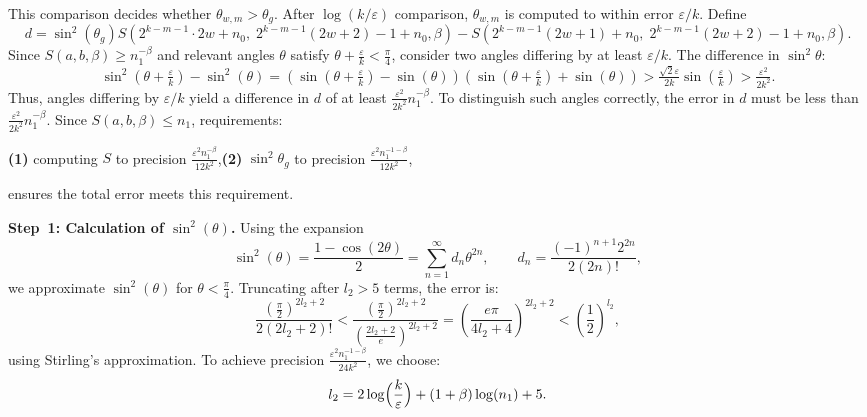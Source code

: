 \documentclass[aps,pra,twocolumn,superscriptaddress,preprintnumbers,amsmath,amssymb]{revtex4-2}
\begin{document}
    This comparison decides whether $\theta_{w,m}>\theta_g$. After $\log(k/\varepsilon)$ comparison,  $\theta_{w,m}$ is computed to within error $\varepsilon/k$. Define
    \begin{equation}
    d=\sin^2(\theta_g)S(2^{k-m-1}\cdot 2w+n_0,\;2^{k-m-1}(2w+2)-1+n_0,\beta)
    -S(2^{k-m-1}(2w+1)+n_0,\;2^{k-m-1}(2w+2)-1+n_0,\beta).
    \end{equation}
    Since $S(a,b,\beta)\ge n_1^{-\beta}$ and relevant angles $\theta$ satisfy 
    $\theta+\frac{\varepsilon}{k}<\frac{\pi}{4}$, consider two angles differing by at least \( \varepsilon/k \). The difference in \( \sin^2 \theta \):
    \begin{equation}
   \sin^2(\theta+\tfrac{\varepsilon}{k})-\sin^2(\theta)=(\sin(\theta+\tfrac{\varepsilon}{k})-\sin(\theta))(\sin(\theta+\tfrac{\varepsilon}{k})+\sin(\theta))>\tfrac{\sqrt{2}\varepsilon}{2k}\sin(\tfrac{\varepsilon}{k})>\tfrac{\varepsilon^2}{2k^2}.
    \end{equation}
    Thus, angles differing by \( \varepsilon/k \) yield a difference in \( d \) of at least $\frac{\varepsilon^2}{2k^2}n_1^{-\beta}$.
    To distinguish such angles correctly, the  error in $d$ must be less than $\frac{\varepsilon^2}{2k^2}n_1^{-\beta}$. Since \( S(a, b, \beta) \leq n_1 \), requirements:
    \begin{center}
        \textbf{(1)}    computing \( S \) to precision \( \frac{\varepsilon^2 n_1^{-\beta}}{12k^2} \),\qquad \qquad\textbf{(2)} \( \sin^2 \theta_g \) to precision \( \frac{\varepsilon^2 n_1^{-1-\beta}}{12k^2} \),
    \end{center}
    ensures the total error meets this requirement.\par
    \textbf{Step~1: Calculation of \boldmath$\sin^2(\theta)$.}  
   Using the expansion
\begin{equation}\label{eq:sin}
\sin^2(\theta)=\frac{1-\cos(2\theta)}{2}
=\sum_{n=1}^\infty d_n\theta^{2n},\qquad d_n=\frac{(-1)^{n+1}2^{2n}}{2(2n)!},
\end{equation}
we approximate \( \sin^2 (\theta) \) for \( \theta < \frac{\pi}{4} \). Truncating after \( l_2 > 5 \) terms, the error is:
\begin{equation}
    \frac{(\frac{\pi}{2})^{2l_2+2}}{2(2l_2+2)!}<\frac{(\frac{\pi}{2})^{2l_2+2}}{(\frac{2l_2+2}{e})^{2l_2+2}}=(\frac{e\pi}{4l_2+4})^{2l_2+2}<(\frac{1}{2})^{l_2},
\end{equation} 
using Stirling’s approximation. To achieve precision \( \frac{\varepsilon^2 n_1^{-1-\beta}}{24k^2} \), we choose:
\begin{equation}
l_2 = 2\log\Bigl(\frac{k}{\varepsilon}\Bigr) + (1+\beta)\log(n_1)+5.
\end{equation}
\end{document}
